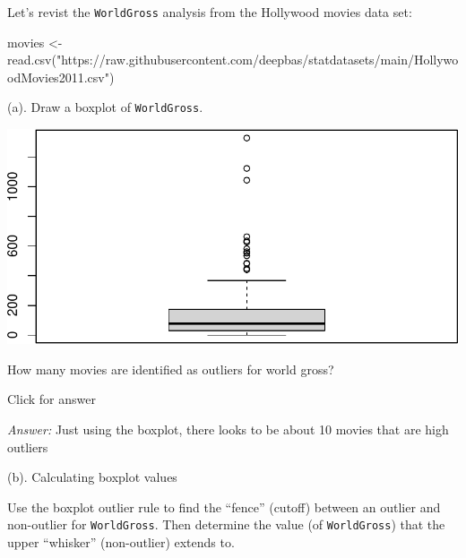 \documentclass[
]{book}
\newenvironment{Shaded}{\begin{snugshade}}{\end{snugshade}}
\newcommand{\FunctionTok}[1]{\textcolor[rgb]{0.00,0.00,0.00}{#1}}
\newcommand{\NormalTok}[1]{#1}
\newcommand{\OtherTok}[1]{\textcolor[rgb]{0.56,0.35,0.01}{#1}}
\newcommand{\SpecialCharTok}[1]{\textcolor[rgb]{0.00,0.00,0.00}{#1}}
\newcommand{\StringTok}[1]{\textcolor[rgb]{0.31,0.60,0.02}{#1}}
\begin{document}
Let's revist the \texttt{WorldGross} analysis from the Hollywood movies data set:

\begin{Shaded}
\begin{Highlighting}[]
\NormalTok{movies }\OtherTok{\textless{}{-}} \FunctionTok{read.csv}\NormalTok{(}\StringTok{"https://raw.githubusercontent.com/deepbas/statdatasets/main/HollywoodMovies2011.csv"}\NormalTok{)}
\end{Highlighting}
\end{Shaded}

(a). Draw a boxplot of \texttt{WorldGross}.

\begin{Shaded}
\end{Shaded}

\includegraphics[width=1\linewidth]{Class_Activity_5_files/figure-latex/unnamed-chunk-25-1}

How many movies are identified as outliers for world gross?

Click for answer

\emph{Answer:} Just using the boxplot, there looks to be about 10 movies that are high outliers

(b). Calculating boxplot values

Use the boxplot outlier rule to find the ``fence'' (cutoff) between an outlier and non-outlier for \texttt{WorldGross}. Then determine the value (of \texttt{WorldGross}) that the upper ``whisker'' (non-outlier) extends to.

\begin{Shaded}
\end{Shaded}
\end{document}
